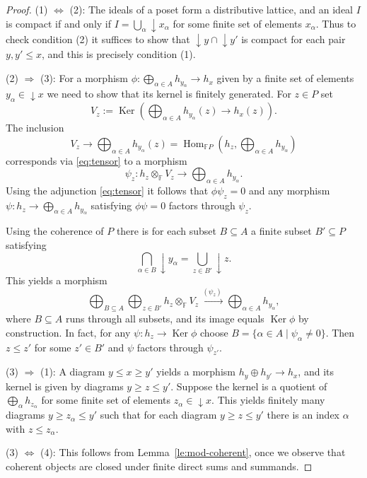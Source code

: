 \documentclass[10pt,a4paper]{amsart}
\def\bbF{\mathbb F}
\newcommand{\Hom}{\operatorname{Hom}}
\newcommand{\Ker}{\operatorname{Ker}}
\newcommand{\lto}{\longrightarrow}
\newcommand{\xto}{\xrightarrow}
\begin{document}
\begin{proof}
  (1) $\Leftrightarrow$ (2): The ideals of a poset form a distributive
  lattice, and an ideal $I$ is compact if and only if
  $I=\bigcup_\alpha\downarrow\! x_\alpha$ for some finite set of elements $x_\alpha$.
  Thus to check condition (2) it suffices to show that $\downarrow\!
  y\cap {\downarrow\! y'}$ is compact for each pair $y,y'\le x$, and
  this is precisely condition (1).

  (2) $\Rightarrow$ (3): For a morphism
  $\phi\colon \bigoplus_{\alpha\in A} h_{y_\alpha}\to h_x$ given by a finite set
  of elements $y_\alpha\in {\downarrow\! x}$ we need to show that its
  kernel is finitely generated.  For $z\in P$ set
  \[V_z:=\Ker\left( \bigoplus_{\alpha\in A} h_{y_\alpha}(z)\to
      h_x(z)\right).\] The inclusion
  \[V_z\lto \bigoplus_{\alpha\in A} h_{y_\alpha}(z)=\Hom_{\bbF P}(h_z,
    \bigoplus_{\alpha\in A} h_{y_\alpha})\] corresponds via \eqref{eq:tensor}
  to a morphism
  \[\psi_z\colon h_z\otimes_\bbF V_z\lto \bigoplus_{\alpha\in A}
  h_{y_\alpha}.\] Using the adjunction \eqref{eq:tensor} it follows that
  $\phi\psi_z=0$ and any morphism
  $\psi\colon h_z\to \bigoplus_{\alpha\in A} h_{y_\alpha}$ satisfying
  $\phi\psi=0$ factors through $\psi_z$.

  Using the coherence of $P$ there is for each subset $B\subseteq A$ a
  finite subset $B'\subseteq P$ satisfying
\[\bigcap_{\alpha\in B}\downarrow\!
  y_\alpha=\bigcup_{z\in B'}\downarrow\! z.\]
This yields a morphism
\[\bigoplus_{B\subseteq A}\bigoplus_{z\in B'}
  h_z\otimes_\bbF V_z\xto{\,(\psi_z)\,} \bigoplus_{\alpha\in A}
  h_{y_\alpha},\] where $B\subseteq A$ runs through all subsets, and its
image equals $\Ker\phi$ by construction. In fact, for any
$\psi\colon h_z\to\Ker\phi$ choose $B=\{\alpha\in A\mid\psi_\alpha\neq 0\}$. Then
$z\le z'$ for some $z'\in B'$ and $\psi$ factors through $\psi_{z'}$.

(3) $\Rightarrow$ (1): A diagram $y\le x\ge
y'$ yields a morphism $h_y\oplus h_{y'}\to h_x$, and its kernel is
given by diagrams $y\ge z\le y'$. Suppose the kernel is
a  quotient of $\bigoplus_\alpha h_{z_\alpha}$  for some finite set of elements
  $z_\alpha\in\downarrow\! x$.  This yields finitely many diagrams $y\ge z_\alpha\le y'$ such that for each
diagram $y\ge z\le y'$ there is an index $\alpha$ with  $z\le z_\alpha$. 

(3) $\Leftrightarrow$ (4): This follows from
Lemma~\ref{le:mod-coherent}, once we observe that coherent objects are
closed under finite direct sums and summands.
\end{proof}
\end{document}

